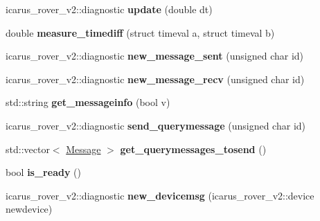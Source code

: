\begin{DoxyCompactItemize}
icarus\+\_\+rover\+\_\+v2\+::diagnostic {\bfseries update} (double dt)
\item 
\mbox{\label{classBoardControllerNodeProcess_abf3a770c5c4f78df116ca9de75a6dd78}} 
double {\bfseries measure\+\_\+timediff} (struct timeval a, struct timeval b)
\item 
\mbox{\label{classBoardControllerNodeProcess_afa66e6cd09dde05e713696b5cb7100ea}} 
icarus\+\_\+rover\+\_\+v2\+::diagnostic {\bfseries new\+\_\+message\+\_\+sent} (unsigned char id)
\item 
\mbox{\label{classBoardControllerNodeProcess_a593f4caf75cd3f1c6f5ebc935a3a6914}} 
icarus\+\_\+rover\+\_\+v2\+::diagnostic {\bfseries new\+\_\+message\+\_\+recv} (unsigned char id)
\item 
\mbox{\label{classBoardControllerNodeProcess_ad1d0497a96da24188002043079b8e910}} 
std\+::string {\bfseries get\+\_\+messageinfo} (bool v)
\item 
\mbox{\label{classBoardControllerNodeProcess_ab295d8f77854e24a9d55f3055973bf60}} 
icarus\+\_\+rover\+\_\+v2\+::diagnostic {\bfseries send\+\_\+querymessage} (unsigned char id)
\item 
\mbox{\label{classBoardControllerNodeProcess_abb4866227145da97d29e2c9ec26e22c2}} 
std\+::vector$<$ \hyperlink{structMessage}{Message} $>$ {\bfseries get\+\_\+querymessages\+\_\+tosend} ()
\item 
\mbox{\label{classBoardControllerNodeProcess_a818e01ecbd2b57b41a4df537866be359}} 
bool {\bfseries is\+\_\+ready} ()
\item 
\mbox{\label{classBoardControllerNodeProcess_ae21934aebfe98dae65dfe60154b196ce}} 
icarus\+\_\+rover\+\_\+v2\+::diagnostic {\bfseries new\+\_\+devicemsg} (icarus\+\_\+rover\+\_\+v2\+::device newdevice)
\item 
\mbox{\label{classBoardControllerNodeProcess_a15ce90f1230113fd955693878bc580ca}} 

\end{DoxyCompactItemize}
